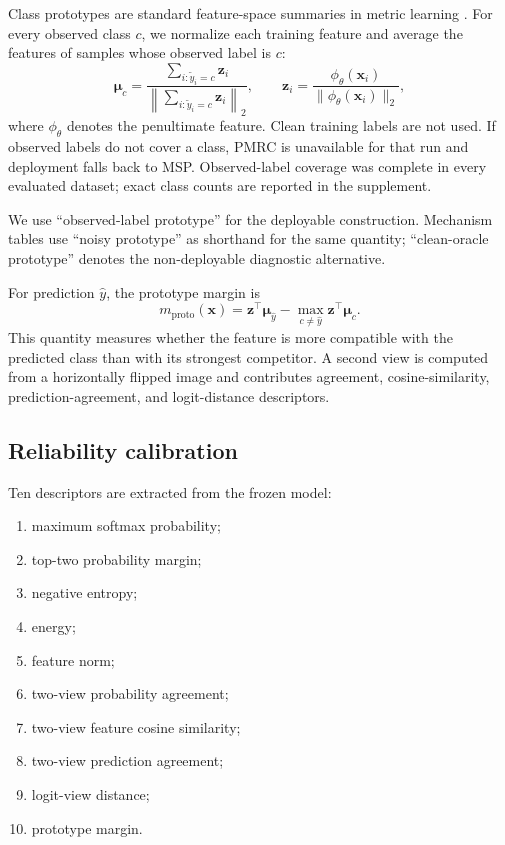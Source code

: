 \documentclass[review,times]{elsarticle}
\newcommand{\vect}[1]{\mathbf{#1}}
\begin{document}
Class prototypes are standard feature-space summaries in metric learning \citep{snell2017prototypical}. For every observed class $c$, we normalize each training feature and average the features of samples whose observed label is $c$:
\begin{equation}
  \bm{\mu}_c=
  \frac{\sum_{i:\tilde y_i=c}\vect{z}_i}
  {\left\|\sum_{i:\tilde y_i=c}\vect{z}_i\right\|_2},
  \qquad
  \vect{z}_i=
  \frac{\phi_\theta(\vect{x}_i)}{\|\phi_\theta(\vect{x}_i)\|_2},
  \label{eq:prototype}
\end{equation}
where $\phi_\theta$ denotes the penultimate feature. Clean training labels are not used. If observed labels do not cover a class, PMRC is unavailable for that run and deployment falls back to MSP. Observed-label coverage was complete in every evaluated dataset; exact class counts are reported in the supplement.

We use ``observed-label prototype'' for the deployable construction.
Mechanism tables use ``noisy prototype'' as shorthand for the same quantity;
``clean-oracle prototype'' denotes the non-deployable diagnostic alternative.

For prediction $\hat y$, the prototype margin is
\begin{equation}
  m_{\mathrm{proto}}(\vect{x})=
  \vect{z}^{\top}\bm{\mu}_{\hat y}
  -
  \max_{c\ne\hat y}\vect{z}^{\top}\bm{\mu}_{c}.
  \label{eq:margin}
\end{equation}
This quantity measures whether the feature is more compatible with the predicted class than with its strongest competitor. A second view is computed from a horizontally flipped image and contributes agreement, cosine-similarity, prediction-agreement, and logit-distance descriptors.

\subsection{Reliability calibration}

Ten descriptors are extracted from the frozen model:
\begin{enumerate}[leftmargin=1.6em,itemsep=0.1em,topsep=0.2em]
  \item maximum softmax probability;
  \item top-two probability margin;
  \item negative entropy;
  \item energy;
  \item feature norm;
  \item two-view probability agreement;
  \item two-view feature cosine similarity;
  \item two-view prediction agreement;
  \item logit-view distance;
  \item prototype margin.
\end{enumerate}
\end{document}

